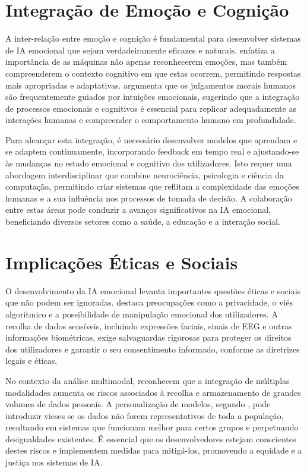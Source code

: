 \documentclass[a4paper,12pt]{report}
\begin{document}
	\section{Integração de Emoção e Cognição}
	
	A inter-relação entre emoção e cognição é fundamental para desenvolver sistemas de IA emocional que sejam verdadeiramente eficazes e naturais. \textcite{picard1997} enfatiza a importância de as máquinas não apenas reconhecerem emoções, mas também compreenderem o contexto cognitivo em que estas ocorrem, permitindo respostas mais apropriadas e adaptativas. \textcite{haidt2001} argumenta que os julgamentos morais humanos são frequentemente guiados por intuições emocionais, sugerindo que a integração de processos emocionais e cognitivos é essencial para replicar adequadamente as interações humanas e compreender o comportamento humano em profundidade.
	
	Para alcançar esta integração, é necessário desenvolver modelos que aprendam e se adaptem continuamente, incorporando feedback em tempo real e ajustando-se às mudanças no estado emocional e cognitivo dos utilizadores. Isto requer uma abordagem interdisciplinar que combine neurociência, psicologia e ciência da computação, permitindo criar sistemas que reflitam a complexidade das emoções humanas e a sua influência nos processos de tomada de decisão. A colaboração entre estas áreas pode conduzir a avanços significativos na IA emocional, beneficiando diversos setores como a saúde, a educação e a interação social.
	
	\section{Implicações Éticas e Sociais}
	
	O desenvolvimento da IA emocional levanta importantes questões éticas e sociais que não podem ser ignoradas. \textcite{mueller2020} destaca preocupações como a privacidade, o viés algorítmico e a possibilidade de manipulação emocional dos utilizadores. A recolha de dados sensíveis, incluindo expressões faciais, sinais de EEG e outras informações biométricas, exige salvaguardas rigorosas para proteger os direitos dos utilizadores e garantir o seu consentimento informado, conforme as diretrizes legais e éticas.
	
	No contexto da análise multimodal, \textcite{lee2024} reconhecem que a integração de múltiplas modalidades aumenta os riscos associados à recolha e armazenamento de grandes volumes de dados pessoais. A personalização de modelos, segundo \textcite{kargarandehkordi2024}, pode introduzir vieses se os dados não forem representativos de toda a população, resultando em sistemas que funcionam melhor para certos grupos e perpetuando desigualdades existentes. É essencial que os desenvolvedores estejam conscientes destes riscos e implementem medidas para mitigá-los, promovendo a equidade e a justiça nos sistemas de IA.
	
\end{document}
